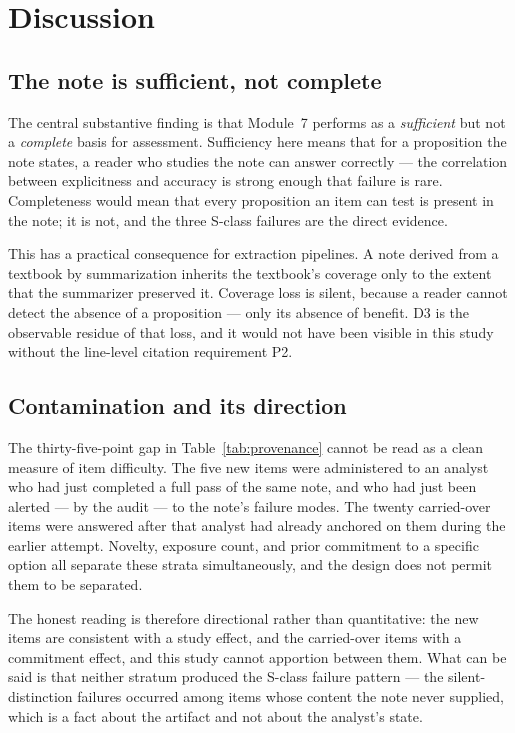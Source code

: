 \documentclass[11pt]{article}
\begin{document}
\section{Discussion}
\label{sec:discussion}

\subsection{The note is sufficient, not complete}

The central substantive finding is that Module~7 performs as a
\emph{sufficient} but not a \emph{complete} basis for assessment. Sufficiency
here means that for a proposition the note states, a reader who studies the
note can answer correctly --- the correlation between explicitness and
accuracy is strong enough that failure is rare. Completeness would mean that
every proposition an item can test is present in the note; it is not, and the
three S-class failures are the direct evidence.

This has a practical consequence for extraction pipelines. A note derived
from a textbook by summarization inherits the textbook's coverage only to
the extent that the summarizer preserved it. Coverage loss is silent,
because a reader cannot detect the absence of a proposition --- only its
absence of benefit. D3 is the observable residue of that loss, and it would
not have been visible in this study without the line-level citation
requirement P2.

\subsection{Contamination and its direction}

The thirty-five-point gap in Table~\ref{tab:provenance} cannot be read as a
clean measure of item difficulty. The five new items were administered to an
analyst who had just completed a full pass of the same note, and who had
just been alerted --- by the audit --- to the note's failure modes. The
twenty carried-over items were answered after that analyst had already
anchored on them during the earlier attempt. Novelty, exposure count, and
prior commitment to a specific option all separate these strata
simultaneously, and the design does not permit them to be separated.

The honest reading is therefore directional rather than quantitative: the
new items are consistent with a study effect, and the carried-over items
with a commitment effect, and this study cannot apportion between them. What
can be said is that neither stratum produced the S-class failure pattern ---
the silent-distinction failures occurred among items whose content the note
never supplied, which is a fact about the artifact and not about the
analyst's state.
\end{document}
